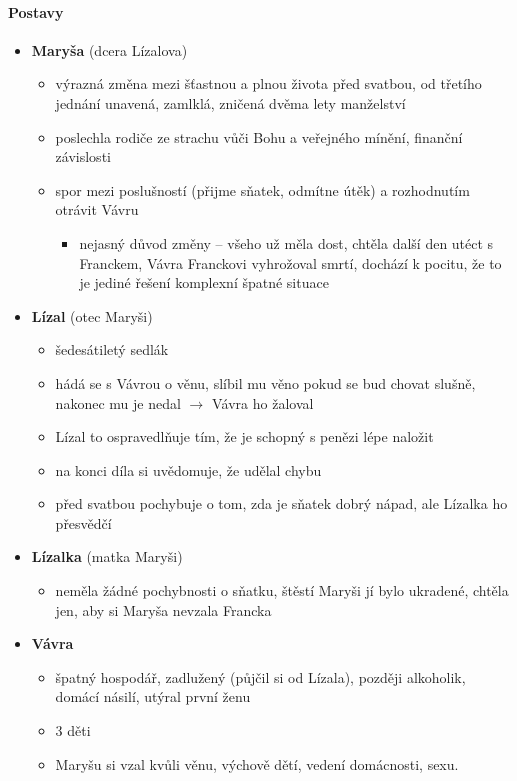 \documentclass[10pt,a4paper]{article}
\newcommand{\ra}{$\rightarrow$ }
\begin{document}
\paragraph{Postavy}
\begin{itemize}
\item \textbf{Maryša} (dcera Lízalova)
	\begin{itemize}
	\item výrazná změna mezi šťastnou a plnou života před svatbou, od třetího jednání unavená, zamlklá, zničená dvěma lety manželství
	\item poslechla rodiče ze strachu vůči Bohu a veřejného mínění, finanční závislosti
	\item spor mezi poslušností (přijme sňatek, odmítne útěk) a rozhodnutím otrávit Vávru
		\begin{itemize}
		\item nejasný důvod změny -- všeho už měla dost, chtěla další den utéct s Franckem, Vávra Franckovi vyhrožoval smrtí, dochází k pocitu, že to je jediné řešení komplexní špatné situace
		\end{itemize}
	\end{itemize}
\item \textbf{Lízal} (otec Maryši)
	\begin{itemize}
	\item šedesátiletý sedlák
	\item hádá se s Vávrou o věnu, slíbil mu věno pokud se bud chovat slušně, nakonec mu je nedal \ra Vávra ho žaloval
	\item Lízal to ospravedlňuje tím, že je schopný s penězi lépe naložit
	\item na konci díla si uvědomuje, že udělal chybu
	\item před svatbou pochybuje o tom, zda je sňatek dobrý nápad, ale Lízalka ho přesvědčí
	\end{itemize}
\item \textbf{Lízalka} (matka Maryši)
	\begin{itemize}
	\item neměla žádné pochybnosti o sňatku, štěstí Maryši jí bylo ukradené, chtěla jen, aby si Maryša nevzala Francka
	\end{itemize}
\item \textbf{Vávra}
	\begin{itemize}
	\item špatný hospodář, zadlužený (půjčil si od Lízala), později alkoholik, domácí násilí, utýral první ženu
	\item 3 děti
	\item Maryšu si vzal kvůli věnu, výchově dětí, vedení domácnosti, sexu.

\end{itemize}
\end{itemize}
\end{document}
